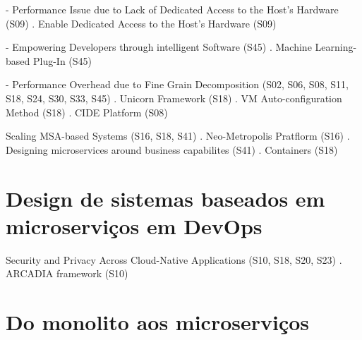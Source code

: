     - Performance Issue due to Lack of Dedicated Access to the Host's Hardware (S09)
        . Enable Dedicated Access to the Host's Hardware (S09)

    - Empowering Developers through intelligent Software (S45)
        . Machine Learning-based Plug-In (S45)

    - Performance Overhead due to Fine Grain Decomposition (S02, S06, S08, S11, S18, S24, S30, S33, S45)
        . Unicorn Framework (S18)
        . VM Auto-configuration Method (S18)
        . CIDE Platform (S08)

    Scaling MSA-based Systems (S16, S18, S41)
        . Neo-Metropolis Pratflorm (S16)
        . Designing microservices around business capabilites (S41)
        . Containers (S18)

\section{Design de sistemas baseados em microserviços em DevOps}

Security and Privacy Across Cloud-Native Applications (S10, S18, S20, S23)
    . ARCADIA framework (S10)

\section{Do monolito aos microserviços}

